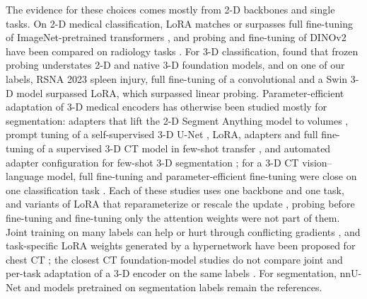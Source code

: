 The evidence for these choices comes mostly from 2-D backbones and single tasks. On 2-D medical classification, LoRA matches or surpasses full fine-tuning of ImageNet-pretrained transformers \citep{dutt2024peft,zhu2024melo}, and probing and fine-tuning of DINOv2 \citep{oquab2023dinov2} have been compared on radiology tasks \citep{baharoon2023dinov2med}. For 3-D classification, \citet{liu2025anymc3d} found that frozen probing understates 2-D and native 3-D foundation models, and on one of our labels, RSNA 2023 spleen injury, full fine-tuning of a convolutional and a Swin 3-D model surpassed LoRA, which surpassed linear probing. Parameter-efficient adaptation of 3-D medical encoders has otherwise been studied mostly for segmentation: adapters that lift the 2-D Segment Anything model \citep{kirillov2023sam} to volumes \citep{gong20243dsamadapter,chen2024masam,wu2025medsa}, prompt tuning of a self-supervised 3-D U-Net \citep{fischer2024prompttuning}, LoRA, adapters and full fine-tuning of a supervised 3-D CT model in few-shot transfer \citep{silvarodriguez2025fseft}, and automated adapter configuration for few-shot 3-D segmentation \citep{ly2026seapeft}; for a 3-D CT vision--language model, full fine-tuning and parameter-efficient fine-tuning were close on one classification task \citep{kartika2026hcc}. Each of these studies uses one backbone and one task, and variants of LoRA that reparameterize or rescale the update \citep{liu2024dora,kalajdzievski2023rslora}, probing before fine-tuning \citep{kumar2022lpft} and fine-tuning only the attention weights \citep{touvron2022three} were not part of them. Joint training on many labels can help \citep{kim2023ctan} or hurt through conflicting gradients \citep{yu2020pcgrad,zhao2023mtlreview}, and task-specific LoRA weights generated by a hypernetwork have been proposed for chest CT \citep{liu2026hyperct}; the closest CT foundation-model studies do not compare joint and per-task adaptation of a 3-D encoder on the same labels \citep{veenboer2025tapct,liu2025anymc3d}. For segmentation, nnU-Net \citep{isensee2021nnunet} and models pretrained on segmentation labels \citep{li2024suprem,he2024vista3d} remain the references.

